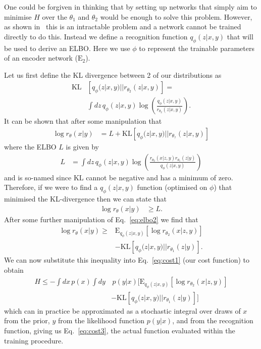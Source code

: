\documentclass[%
showpacs,
 amsmath,amssymb,
 aps,
 twocolumn,
 prl,
 reprint,
floatfix,
]{revtex4-1}
\begin{document}
One could be forgiven in thinking that by setting up networks that simply aim
to minimise $H$ over the $\theta_{1}$ and $\theta_{2}$ would be enough to solve
this problem. However, as shown in~\cite{NIPS2015_5775} this is an intractable
problem and a network cannot be trained directly to do this. Instead we define
a recognition function $q_{\phi}(z|x,y)$ that will be used to derive an
\ac{ELBO}. Here we use $\phi$ to represent the trainable parameters of an
encoder network ($\text{E}_{2}$).

Let us first define the \ac{KL} divergence between 2 of our
distributions as
%
\begin{align}\label{eq:kl}
\text{KL}&\left[q_{\phi}(z|x,y)||r_{\theta_{2}}(z|x,y)\right] = \\
&\int dz\,q_{\phi}(z|x,y)
\log\left(\frac{q_{\phi}(z|x,y)}{r_{\theta_{2}}(z|x,y)}\right).\nonumber
\end{align}
%  
It can be shown that after some manipulation that
%
\begin{align}\label{eq:elbo1}
\log r_{\theta}(x|y) &= L + \text{KL}\left[q_{\phi}(z|x,y)||r_{\theta_{?}}(z|x,y)\right]
\end{align}
%
where the \ac{ELBO} $L$ is given by
%
\begin{align}\label{eq:elbo2}
L &= \int dz\,
q_{\phi}(z|x,y)\log\left(\frac{r_{\theta_{2}}(x|z,y)r_{\theta_{1}}(z|y)}{q_{\phi}(z|x,y)}\right)
\end{align}
%
and is so-named since $\text{KL}$ cannot be negative and has a minimum of zero.
Therefore, if we were to find a $q_{\phi}(z|x,y)$ function (optimised on
$\phi$) that minimised the \ac{KL}-divergence then we can state that
%
\begin{align}
\log r_{\theta}(x|y) &\geq L.
\end{align}
%
After some further manipulation of Eq.~\ref{eq:elbo2} we find that
%
\begin{align}\label{eq:logr}
\log r_{\theta}(x|y) \geq  &\text{E}_{q_{\phi}(z|x,y)}\left[\log
r_{\theta_{2}}(x|z,y)\right] \nonumber\\
&-\text{KL}\left[q_{\phi}(z|x,y)||r_{\theta_{1}}(z|y)\right].
\end{align}
%
We can now substitute this inequality into Eq.~\ref{eq:cost1} (our cost
function) to obtain
%
\begin{align}\label{eq:cost2}
H \leq  -\int dx\, p(x)\int dy &\,p(y|x)
\Big[\text{E}_{q_{\phi}(z|x,y)}\left[\log r_{\theta_{2}}(x|z,y)\right]
\nonumber\\
&-\text{KL}\left[q_{\phi}(z|x,y)||r_{\theta_{1}}(z|y)\right]\Big]  
\end{align}
%
which can in practice be approximated as a stochastic integral over draws of
$x$ from the prior, $y$ from the likelihood function $p(y|x)$, and from the
recognition function, giving us Eq.~\ref{eq:cost3}, the actual function
evaluated within the training procedure.
\end{document}
